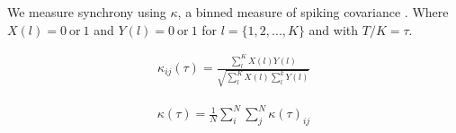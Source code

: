 \documentclass{article}
\begin{document}
We measure synchrony using $\kappa$, a binned measure of spiking covariance \cite{Wang1996}. Where $X(l) = 0 \ \text{or} \ 1$ and $Y(l) = 0 \ \text{or} \ 1$ for $l = \{1, 2, ..., K \}$ and with $T/K = \tau$.

\begin{align}
    \label{eq:kappa}
    \kappa_{ij}(\tau) = \frac{\sum_l^K X(l)Y(l)}{\sqrt{\sum_l^K X(l) \sum_l^k Y(l)}}
\end{align}

\begin{align}
\kappa(\tau) = \frac{1}{N} \sum_i^N \sum_j^N \kappa(\tau)_{ij}
\end{align}




\end{document}
